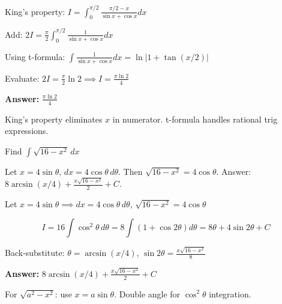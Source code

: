 \begin{solution}
King's property: $I = \int_0^{\pi/2}\frac{\pi/2-x}{\sin x+\cos x}dx$

Add: $2I = \frac{\pi}{2}\int_0^{\pi/2}\frac{1}{\sin x+\cos x}dx$

Using t-formula: $\int\frac{1}{\sin x+\cos x}dx = \ln|1+\tan(x/2)|$

Evaluate: $2I = \frac{\pi}{2}\ln 2 \implies I = \frac{\pi\ln 2}{4}$

\textbf{Answer:} $\boxed{\frac{\pi\ln 2}{4}}$
\end{solution}

\begin{takeaways}
King's property eliminates $x$ in numerator. t-formula handles rational trig expressions.
\end{takeaways}

\vspace{1cm}

\begin{problem}
Find $\displaystyle \int \sqrt{16 - x^2} \, dx$
\end{problem}

\begin{hint}
Let $x = 4\sin\theta$, $dx = 4\cos\theta \, d\theta$. Then $\sqrt{16-x^2} = 4\cos\theta$. Answer: $8\arcsin(x/4) + \frac{x\sqrt{16-x^2}}{2} + C$.
\end{hint}

\begin{solution}
Let $x=4\sin\theta \implies dx=4\cos\theta\,d\theta$, $\sqrt{16-x^2}=4\cos\theta$

\[
I = 16\int\cos^2\theta\,d\theta = 8\int(1+\cos 2\theta)d\theta = 8\theta + 4\sin 2\theta + C
\]

Back-substitute: $\theta=\arcsin(x/4)$, $\sin 2\theta = \frac{x\sqrt{16-x^2}}{8}$

\textbf{Answer:} $\boxed{8\arcsin(x/4) + \frac{x\sqrt{16-x^2}}{2} + C}$
\end{solution}

\begin{takeaways}
For $\sqrt{a^2-x^2}$: use $x=a\sin\theta$. Double angle for $\cos^2\theta$ integration.
\end{takeaways}

\vspace{1cm}

